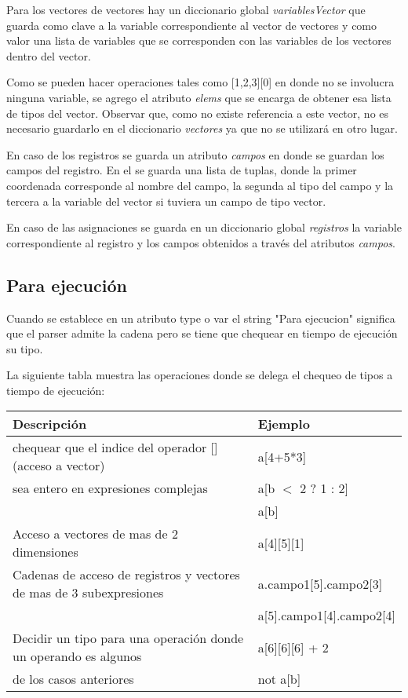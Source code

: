 Para los vectores de vectores hay un diccionario global \textit{variablesVector} que guarda como clave a la variable correspondiente al vector de vectores y como valor una lista de variables que se corresponden con las variables de los vectores dentro del vector.

Como se pueden hacer operaciones tales como [1,2,3][0] en donde no se involucra ninguna variable, se agrego el atributo \textit{elems} que se encarga de obtener esa lista de tipos del vector. Observar que, como no existe referencia a este vector, no es necesario guardarlo en el diccionario \textit{vectores} ya que no se utilizará en otro lugar.

En caso de los registros se guarda un atributo \textit{campos} en donde se guardan los campos del registro. En el se guarda una lista de tuplas, donde la primer coordenada corresponde al nombre del campo, la segunda al tipo del campo y la tercera a la variable del vector si tuviera un campo de tipo vector.

En caso de las asignaciones se guarda en un diccionario global \textit{registros} la variable correspondiente al registro y los campos obtenidos a través del atributos \textit{campos}.

\subsection{Para ejecución}
Cuando se establece en un atributo type o var el string "Para ejecucion" significa que el parser admite la cadena pero se tiene que chequear en tiempo de ejecución su tipo. 

La siguiente tabla muestra las operaciones donde se delega el chequeo de tipos a tiempo de ejecución:



\begin{table}[H]
\begin{center}
\begin{tabular}{|l|l|}
\hline
Descripción & Ejemplo \\
\hline
chequear que el indice del operador [] (acceso a vector)	& a[4+5*3] \\
 sea entero en expresiones complejas	& a[b $<$ 2 ? 1 : 2] \\
  										& a[b] \\
\hline
Acceso a vectores de mas de 2 dimensiones & a[4][5][1] \\
\hline
Cadenas de acceso de registros y vectores de mas de 3 subexpresiones & a.campo1[5].campo2[3] \\
										& a[5].campo1[4].campo2[4] \\
\hline
Decidir un tipo para una operación donde un operando es algunos  & a[6][6][6] + 2 \\
de los casos anteriores  & not a[b]\\
\hline
\end{tabular}
\end{center}
\end{table}

